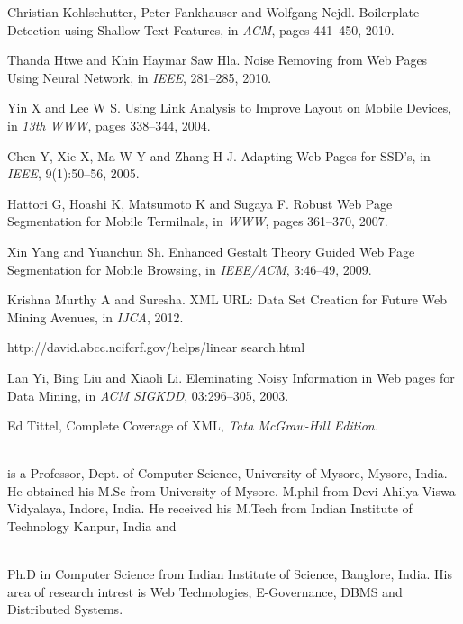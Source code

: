 \documentclass[fleqn,twoside]{article}
\begin{document}
\begin{thebibliography}{00}
{Christian Kohlschutter, Peter Fankhauser and Wolfgang Nejdl}. {Boilerplate Detection using Shallow Text Features}, in \emph{ACM}, pages 441--450, 2010.

{Thanda Htwe and Khin Haymar Saw Hla}. {Noise Removing from Web Pages Using Neural Network}, in \emph{IEEE}, 281--285, 2010.

{Yin X and Lee W S}. {Using Link Analysis to  Improve Layout on Mobile Devices}, in \emph{13th WWW}, pages 338--344, 2004.

{Chen Y, Xie X, Ma W Y and Zhang H J}. {Adapting Web Pages for SSD's}, in \emph{IEEE}, 9(1):50--56, 2005.


{Hattori G, Hoashi K, Matsumoto K and Sugaya F}. {Robust Web Page Segmentation for Mobile Termilnals}, in \emph{WWW}, pages 361--370, 2007.

{Xin Yang and Yuanchun Sh}. {Enhanced Gestalt Theory Guided Web Page Segmentation for Mobile Browsing}, in \emph{IEEE/ACM}, 3:46--49, 2009.




{Krishna Murthy A and Suresha}. {XML URL: Data Set Creation for Future Web Mining Avenues}, in \emph{IJCA}, 2012.

http://david.abcc.ncifcrf.gov/helps/linear search.html

{Lan Yi, Bing Liu and Xiaoli Li}. {Eleminating Noisy Information in Web pages for Data Mining}, in \emph{ACM SIGKDD}, 03:296--305, 2003.

Ed Tittel, Complete Coverage of XML, {\it Tata McGraw-Hill Edition.}\\\\
\small
\balance

 

\end{thebibliography}



\begin{minipage}[b][1in][c]{1.8in}
{is a Professor, Dept. of Computer Science, University of Mysore, Mysore, India. He obtained his M.Sc from University of Mysore. M.phil from Devi Ahilya Viswa Vidyalaya, Indore, India. He received his M.Tech from Indian Institute of Technology Kanpur, India and  }\\\\
\end{minipage} Ph.D in Computer Science from Indian Institute of Science, Banglore, India. His area of research intrest is Web Technologies, E-Governance, DBMS and Distributed Systems.\\\\
\end{document}
